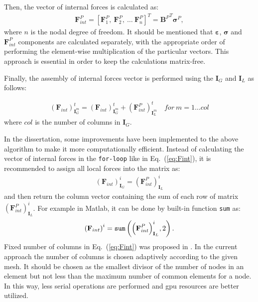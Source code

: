Then, the vector of internal forces is calculated as:
\begin{eqnarray}
	\label{eq:forces}
	\textbf{F}^P_{int}=\left[\textbf{F}^P_1,\ \textbf{F}^P_2,\ \ldots\ \textbf{F}^P_{n} \right]^T={\textbf{B}^P}^T\boldsymbol{\sigma}^P,
\end{eqnarray}
where $n$ is the nodal degree of freedom.
It should be mentioned that \(\boldsymbol{\varepsilon}\), \(\boldsymbol{\sigma}\) and \(\textbf{F}^P_{int}\) components are calculated separately, with the appropriate order of performing the element-wise multiplication of the particular vectors.
This approach is essential in order to keep the calculations matrix-free.

Finally, the assembly of internal forces vector is performed using the \(\textbf{I}_G\) and \(\textbf{I}_L\) as follows:

\begin{eqnarray}
	\label{eq:Fint}
	{\left(\textbf{F}_{int}\right)}^t_{\textbf{I}^m_G} = {\left(\textbf{F}_{int}\right)}^t_{\textbf{I}^m_G} + {\left(\textbf{F}^P_{int}\right)}^t_{\textbf{I}^m_L}\quad for\ m=1\ldots col 
\end{eqnarray}
where \(col\) is the number of columns in \(\textbf{I}_G\).

In the dissertation, some improvements have been implemented to the above algorithm to make it more computationally efficient.
Instead of calculating the vector of internal forces in the \verb+for-loop+ like in Eq.~(\ref{eq:Fint}), it is recommended to assign all local forces into the matrix as:
\begin{eqnarray}
	\label{eq:Fmatrix}
	{\left(\textbf{F}_{int}\right)}^i_{\textbf{I}_G} ={\left(\textbf{F}^P_{int}\right)}^i_{\textbf{I}_L}
\end{eqnarray}
and then return the column vector containing the sum of each row of matrix \({\left(\textbf{F}^P_{int}\right)}^i_{\textbf{I}_L}\).
For example in Matlab, it can be done by built-in function \verb|sum| as:
\begin{eqnarray}
	\label{eq:Fsum}
	{\left(\textbf{F}_{int}\right)}^i = \verb|sum| \left({\left(\textbf{F}^P_{int}\right)}^i_{\textbf{I}_L},2\right).
\end{eqnarray}
Fixed number of columns in Eq.~(\ref{eq:Fint}) was proposed in \cite{kudela2016parallel}.
In the current approach the number of columns is chosen adaptively according to the given mesh.
It should be chosen as the smallest divisor of the number of nodes in an element but not less than the maximum number of common elements for a node.
In this way, less serial operations are performed and \ac{gpu} resources are better utilized.

